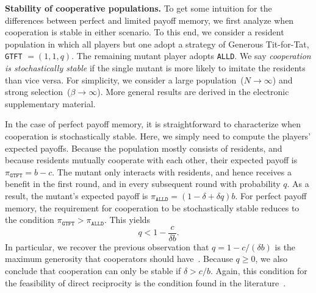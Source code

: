 \documentclass[11pt]{article}
\def\alld{\texttt{ALLD}}
\def\gtft{\texttt{GTFT}}
\def\esm{electronic supplementary material}
\theoremstyle{plainCl1}
\theoremstyle{plainCl2}
\begin{document}

\noindent
{\bf Stability of cooperative populations.}
To get some intuition for the differences between perfect and limited payoff memory, we first analyze when cooperation is stable in either scenario.
To this end, we consider a resident population in which all players but one adopt a strategy of Generous Tit-for-Tat, \gtft{} $=\!(1,1,q)$. 
The remaining mutant player adopts \alld. 
We say {\it cooperation is stochastically stable} if the single mutant is more likely to imitate the residents than vice versa. 
For simplicity, we consider a large population~($N\!\rightarrow\!\infty$) and strong selection~($\beta\!\rightarrow\!\infty$).
More general results are derived in the \esm. 


In the case of perfect payoff memory, it is straightforward to characterize when cooperation is stochastically stable. 
Here, we simply need to compute the players' expected payoffs. 
Because the population mostly consists of residents, and because residents mutually cooperate with each other, their expected payoff is $\pi_\gtft = b\!-\!c$. 
The mutant only interacts with residents, and hence receives a benefit in the first round, and in every subsequent round with probability $q$. 
As a result, the mutant's expected payoff is $\pi_\alld \!=\! (1\!-\!\delta\!+\!\delta q)b$. 
For perfect payoff memory, the requirement for cooperation to be stochastically stable reduces to the condition $\pi_\gtft > \pi_\alld$. 
This yields
\begin{equation} \label{Eq:PerfectMemory}
q < 1\!-\!\frac{c}{\delta  b}.
\end{equation}
In particular, we recover the previous observation that $q\!=\!1-c/(\delta b)$ is the maximum generosity that cooperators should have~\citep{molander:jcr:1985,Nowak1992tit,Schmid:NHB:2021}. 
Because $q\!\ge\!0$, we also conclude that cooperation can only be stable if $\delta \!>\! c/b$.
Again, this condition for the feasibility of direct reciprocity is the condition found in the literature~\citep{nowak:Science:2006}.

\end{document}
